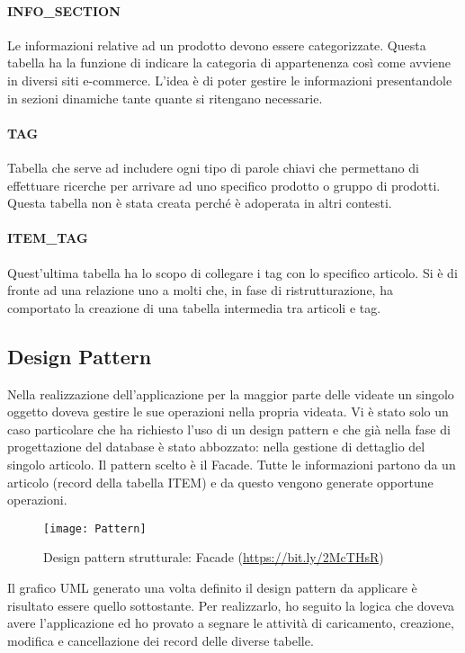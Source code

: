 \paragraph{INFO\_SECTION}
Le informazioni relative ad un prodotto devono essere categorizzate. Questa tabella ha la funzione di indicare la categoria di appartenenza così come avviene in diversi siti e-commerce. L'idea è di poter gestire le informazioni presentandole in sezioni dinamiche tante quante si ritengano necessarie. 

\paragraph{TAG}
Tabella che serve ad includere ogni tipo di parole chiavi che permettano di effettuare ricerche per arrivare ad uno specifico prodotto o gruppo di prodotti. Questa tabella non è stata creata perché è adoperata in altri contesti.

\paragraph{ITEM\_TAG}
Quest'ultima tabella ha lo scopo di collegare i tag con lo specifico articolo. Si è di fronte ad una relazione uno a molti che, in fase di ristrutturazione, ha comportato la creazione di una tabella intermedia tra articoli e tag.



\subsection{Design Pattern}
Nella realizzazione dell'applicazione per la maggior parte delle videate un singolo oggetto doveva gestire le sue operazioni nella propria videata. Vi è stato solo un caso particolare che ha richiesto l'uso di un design pattern e che già nella fase di progettazione del database è stato abbozzato: nella gestione di dettaglio del singolo articolo.
Il pattern scelto è il Facade. Tutte le informazioni partono da un articolo (record della tabella ITEM) e da questo vengono generate opportune operazioni.\\

\begin{figure}[!h] 
	\centering 
	\texttt{[image: Pattern]} 
	\caption{Design pattern strutturale: Facade (\url{https://bit.ly/2McTHsR})}
	\label{Pattern}
\end{figure}


Il grafico UML generato una volta definito il design pattern da applicare è risultato essere quello sottostante. Per realizzarlo, ho seguito la logica che doveva avere l'applicazione ed ho provato a segnare le attività di caricamento, creazione, modifica e cancellazione dei record delle diverse tabelle.

